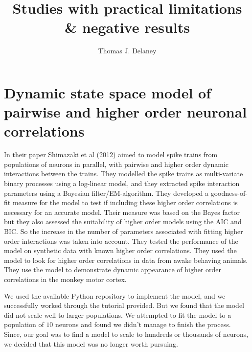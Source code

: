 \documentclass[a4paper,12pt]{article}
\title{Studies with practical limitations \& negative results}
\date{}
\author[1]{Thomas J. Delaney}
\affil[1]{School of Computer Science, Electrical and Electronic Engineering, and Engineering Mathematics, University of Bristol, Bristol, United Kingdom.}
\theoremstyle{definition}
\begin{document}
\maketitle


\section{Dynamic state space model of pairwise and higher order neuronal correlations}
In their paper Shimazaki et al (2012) aimed to model spike trains from populations of neurons in parallel, with pairwise and higher order dynamic interactions between the trains. They modelled the spike trains as multi-variate binary processes using a log-linear model, and they extracted spike interaction parameters using a Bayesian filter/EM-algorithm. They developed a goodness-of-fit measure for the model to test if including these higher order correlations is necessary for an accurate model. Their measure was based on the Bayes factor but they also assessed the suitability of higher order models using the AIC and BIC. So the increase in the number of parameters associated with fitting higher order interactions was taken into account. They tested the performance of the model on synthetic data with known higher order correlations. They used the model to look for higher order correlations in data from awake behaving animals. They use the model to demonstrate dynamic appearance of higher order correlations in the monkey motor cortex\cite{shimazaki}.

We used the available Python repository to implement the model, and we successfully worked through the tutorial provided. But we found that the model did not scale well to larger populations. We attempted to fit the model to a population of $10$ neurons and found we didn't manage to finish the process. Since, our goal was to find a model to scale to hundreds or thousands of neurons, we decided that this model was no longer worth pursuing.
\end{document}
